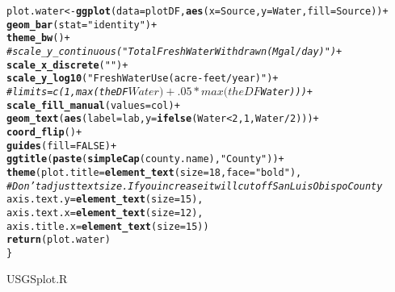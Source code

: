 \documentclass[english]{article}\usepackage[]{graphicx}\usepackage[]{color}
\makeatletter
\newcommand{\hlnum}[1]{\textcolor[rgb]{0.686,0.059,0.569}{#1}}%
\newcommand{\hlstr}[1]{\textcolor[rgb]{0.192,0.494,0.8}{#1}}%
\newcommand{\hlcom}[1]{\textcolor[rgb]{0.678,0.584,0.686}{\textit{#1}}}%
\newcommand{\hlopt}[1]{\textcolor[rgb]{0,0,0}{#1}}%
\newcommand{\hlstd}[1]{\textcolor[rgb]{0.345,0.345,0.345}{#1}}%
\newcommand{\hlkwb}[1]{\textcolor[rgb]{0.69,0.353,0.396}{#1}}%
\newcommand{\hlkwc}[1]{\textcolor[rgb]{0.333,0.667,0.333}{#1}}%
\newcommand{\hlkwd}[1]{\textcolor[rgb]{0.737,0.353,0.396}{\textbf{#1}}}%
\newenvironment{kframe}{%
 \def\at@end@of@kframe{}%
 \ifinner\ifhmode%
  \def\at@end@of@kframe{\end{minipage}}%
  \begin{minipage}{\columnwidth}%
 \fi\fi%
 \def\FrameCommand##1{\hskip\@totalleftmargin \hskip-\fboxsep
 \colorbox{shadecolor}{##1}\hskip-\fboxsep
     \hskip-\linewidth \hskip-\@totalleftmargin \hskip\columnwidth}%
 \MakeFramed {\advance\hsize-\width
   \@totalleftmargin\z@ \linewidth\hsize
   \@setminipage}}%
 {\par\unskip\endMakeFramed%
 \at@end@of@kframe}
\newenvironment{knitrout}{}{} %
\makeatother
\begin{document}
\begin{knitrout}
\begin{kframe}
\begin{alltt}
  \hlstd{plot.water} \hlkwb{<-} \hlkwd{ggplot}\hlstd{(}\hlkwc{data} \hlstd{= plotDF,} \hlkwd{aes}\hlstd{(}\hlkwc{x}\hlstd{=Source,}\hlkwc{y}\hlstd{=Water,} \hlkwc{fill} \hlstd{=Source ))}\hlopt{+}
    \hlkwd{geom_bar}\hlstd{(}\hlkwc{stat}\hlstd{=}\hlstr{"identity"}\hlstd{)}\hlopt{+}
    \hlkwd{theme_bw}\hlstd{()}\hlopt{+}
\hlcom{#    scale_y_continuous("Total Fresh Water Withdrawn (Mgal/day)")+}
    \hlkwd{scale_x_discrete}\hlstd{(}\hlstr{""}\hlstd{)} \hlopt{+}
    \hlkwd{scale_y_log10}\hlstd{(}\hlstr{"Fresh Water Use (acre-feet/year)"}\hlstd{)} \hlopt{+}
\hlcom{#                  limits = c(1, max(theDF$Water) + .05 * max(theDF$Water))) +}
  \hlkwd{scale_fill_manual}\hlstd{(}\hlkwc{values} \hlstd{= col)} \hlopt{+}
  \hlkwd{geom_text}\hlstd{(}\hlkwd{aes}\hlstd{(}\hlkwc{label} \hlstd{= lab,} \hlkwc{y} \hlstd{=} \hlkwd{ifelse}\hlstd{(Water} \hlopt{<} \hlnum{2}\hlstd{,} \hlnum{1}\hlstd{, Water} \hlopt{/} \hlnum{2}\hlstd{)))} \hlopt{+}
    \hlkwd{coord_flip}\hlstd{()}\hlopt{+}
    \hlkwd{guides}\hlstd{(}\hlkwc{fill}\hlstd{=}\hlnum{FALSE}\hlstd{)}\hlopt{+}
    \hlkwd{ggtitle}\hlstd{(}\hlkwd{paste}\hlstd{(}\hlkwd{simpleCap}\hlstd{(county.name),} \hlstr{"County"}\hlstd{))}\hlopt{+}
    \hlkwd{theme}\hlstd{(}\hlkwc{plot.title} \hlstd{=} \hlkwd{element_text}\hlstd{(}\hlkwc{size}\hlstd{=}\hlnum{18}\hlstd{,} \hlkwc{face}\hlstd{=}\hlstr{"bold"}\hlstd{),}
                \hlcom{#Don't adjust text size. If you increase it will cut off San Luis Obispo County}
          \hlkwc{axis.text.y} \hlstd{=} \hlkwd{element_text}\hlstd{(}\hlkwc{size} \hlstd{=} \hlnum{15}\hlstd{),}
          \hlkwc{axis.text.x} \hlstd{=} \hlkwd{element_text}\hlstd{(}\hlkwc{size} \hlstd{=} \hlnum{12}\hlstd{),}
          \hlkwc{axis.title.x} \hlstd{=} \hlkwd{element_text}\hlstd{(}\hlkwc{size} \hlstd{=} \hlnum{15}\hlstd{))}
  \hlkwd{return}\hlstd{(plot.water)}
\hlstd{\}}
\end{alltt}
\end{kframe}
\end{knitrout}

USGSplot.R
\end{document}
